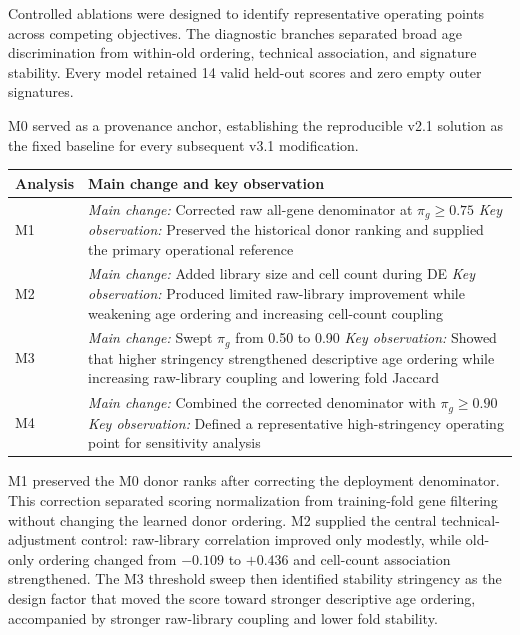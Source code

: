 \documentclass[10pt,twocolumn]{article}
\begin{document}
Controlled ablations were designed to identify representative operating points across competing objectives. The diagnostic branches separated broad age discrimination from within-old ordering, technical association, and signature stability. Every model retained 14 valid held-out scores and zero empty outer signatures.

M0 served as a provenance anchor, establishing the reproducible v2.1 solution as the fixed baseline for every subsequent v3.1 modification.

\noindent\begin{minipage}{\columnwidth}
\centering
\footnotesize
{}
\label{tab:ablation-summary}
\begin{tabularx}{\columnwidth}{@{}l X@{}}
\toprule
Analysis & Main change and key observation \\
\midrule
M1 & \textit{Main change:} Corrected raw all-gene denominator at \(\pi_g\geq0.75\) \newline \textit{Key observation:} Preserved the historical donor ranking and supplied the primary operational reference \\
M2 & \textit{Main change:} Added library size and cell count during DE \newline \textit{Key observation:} Produced limited raw-library improvement while weakening age ordering and increasing cell-count coupling \\
M3 & \textit{Main change:} Swept \(\pi_g\) from 0.50 to 0.90 \newline \textit{Key observation:} Showed that higher stringency strengthened descriptive age ordering while increasing raw-library coupling and lowering fold Jaccard \\
M4 & \textit{Main change:} Combined the corrected denominator with \(\pi_g\geq0.90\) \newline \textit{Key observation:} Defined a representative high-stringency operating point for sensitivity analysis \\
\bottomrule
\end{tabularx}
\end{minipage}\par\medskip

M1 preserved the M0 donor ranks after correcting the deployment denominator. This correction separated scoring normalization from training-fold gene filtering without changing the learned donor ordering. M2 supplied the central technical-adjustment control: raw-library correlation improved only modestly, while old-only ordering changed from \(-0.109\) to \(+0.436\) and cell-count association strengthened. The M3 threshold sweep then identified stability stringency as the design factor that moved the score toward stronger descriptive age ordering, accompanied by stronger raw-library coupling and lower fold stability.
\end{document}
